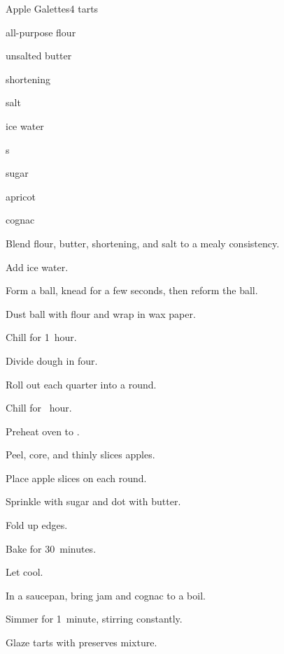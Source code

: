 \begin{recipe}{Apple Galettes}{}{4 tarts}

\begin{ingredients}
\item \C{1\quarter} all-purpose flour
\item {} unsalted butter
\item {} shortening
\item \tp{\quarter} salt
\item {} ice water
\item {}s
\item sugar
\item \C{\half} apricot 
\item {} cognac
\end{ingredients}

\begin{directions}
\item Blend flour, butter, shortening, and salt to a mealy consistency.
\item Add ice water.
\item Form a ball, knead for a few seconds, then reform the ball.
\item Dust ball with flour and wrap in wax paper.
\item Chill for 1~hour.
\item Divide dough in four.
\item Roll out each quarter into a  round.
\item Chill for \half~hour.
\item Preheat oven to .
\item Peel, core, and thinly slices apples.
\item Place apple slices on each round.
\item Sprinkle with sugar and dot with butter.
\item Fold up edges.
\item Bake for 30~minutes.
\item Let cool.
\item In a saucepan, bring jam and cognac to a boil.
\item Simmer for 1~minute, stirring constantly.
\item Glaze tarts with preserves mixture.
\end{directions}

\end{recipe}
